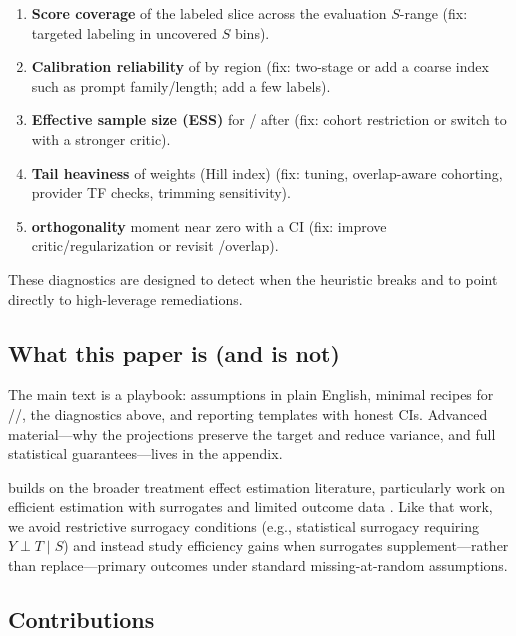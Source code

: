 \begin{enumerate}[label=(\alph*)]
\item \textbf{Score coverage} of the labeled slice across the evaluation $S$-range (fix: targeted labeling in uncovered $S$ bins).

\item \textbf{Calibration reliability} of \autocal{} by region (fix: two-stage \autocal{} or add a coarse index such as prompt family/length; add a few labels).

\item \textbf{Effective sample size (ESS)} for \ips/\dr{} after \simcal{} (fix: cohort restriction or switch to \dr{} with a stronger critic).

\item \textbf{Tail heaviness} of weights (Hill index) (fix: \simcal{} tuning, overlap-aware cohorting, provider TF checks, trimming sensitivity).

\item \textbf{\dr{} orthogonality} moment near zero with a CI (fix: improve critic/regularization or revisit \simcal/overlap).
\end{enumerate}

These diagnostics are designed to detect when the heuristic breaks and to point directly to high-leverage remediations.

\subsection{What this paper is (and is not)}

The main text is a playbook: assumptions in plain English, minimal recipes for \dm/\ips/\dr, the diagnostics above, and reporting templates with honest CIs. Advanced material---why the projections preserve the target and reduce variance, and full statistical guarantees---lives in the appendix.

\cje{} builds on the broader treatment effect estimation literature, particularly work on efficient estimation with surrogates and limited outcome data \cite{kallus2024role}. Like that work, we avoid restrictive surrogacy conditions (e.g., statistical surrogacy requiring $Y \perp T \mid S$) and instead study efficiency gains when surrogates supplement---rather than replace---primary outcomes under standard missing-at-random assumptions.

\subsection{Contributions}

